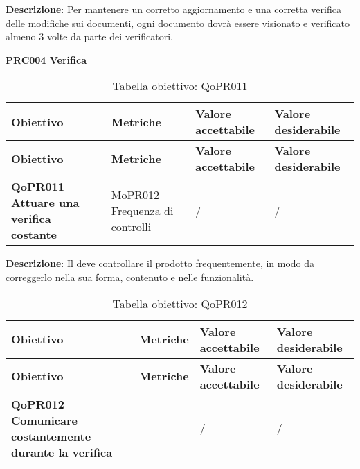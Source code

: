 \documentclass[../piano-di-qualifica.tex]{subfiles}
\begin{document}
\textbf{Descrizione}: Per mantenere un corretto aggiornamento e una corretta verifica delle modifiche sui documenti, ogni documento dovrà essere visionato e verificato almeno 3 volte da parte dei verificatori.

        \begin{center}
            \centering
            \textbf{PRC004 Verifica}
        \end{center}

        \renewcommand{\arraystretch}{2} %
        \begin{longtable}[H]{>{\centering\bfseries}m{5cm} >{\centering}m{5cm} >{\centering}m{2.5cm} >{\centering\arraybackslash}m{2.5cm}}  
            \caption{Tabella obiettivo: QoPR011}%
            \label{tab:obiettivo_qopr011} \\
          \rowcolor{lightgray}
          {\textbf{Obiettivo}} & {\textbf{Metriche}} & {\textbf{Valore accettabile}} & {\textbf{Valore desiderabile}}  \\
          \endfirsthead%
          \rowcolor{lightgray}
          {\textbf{Obiettivo}} & {\textbf{Metriche}} & {\textbf{Valore accettabile}} & {\textbf{Valore desiderabile}}  \\
          \endhead%
          \textbf{QoPR011 Attuare una verifica costante} & MoPR012 Frequenza di controlli & / & / \\
        \end{longtable}
        
        \textbf{Descrizione}: Il  deve controllare il prodotto frequentemente, in modo da correggerlo nella sua forma, contenuto e nelle funzionalità.
        
        \renewcommand{\arraystretch}{2} %
        \begin{longtable}[H]{>{\centering\bfseries}m{5cm} >{\centering}m{5cm} >{\centering}m{2.5cm} >{\centering\arraybackslash}m{2.5cm}}  
            \caption{Tabella obiettivo: QoPR012}%
            \label{tab:obiettivo_qopr012} \\
          \rowcolor{lightgray}
          {\textbf{Obiettivo}} & {\textbf{Metriche}} & {\textbf{Valore accettabile}} & {\textbf{Valore desiderabile}}  \\
          \endfirsthead%
          \rowcolor{lightgray}
          {\textbf{Obiettivo}} & {\textbf{Metriche}} & {\textbf{Valore accettabile}} & {\textbf{Valore desiderabile}}  \\
          \endhead%
          \textbf{QoPR012 Comunicare costantemente durante la verifica} &  & / & / \\
        \end{longtable}
        
\end{document}
